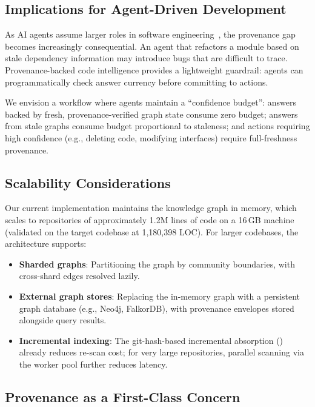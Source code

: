 \documentclass[conference]{IEEEtran}
\begin{document}
\subsection{Implications for Agent-Driven Development}

As AI agents assume larger roles in software
engineering~\cite{DevinAI2024, CopilotWorkspace2024}, the provenance
gap becomes increasingly consequential. An agent that refactors a
module based on stale dependency information may introduce bugs that are
difficult to trace. Provenance-backed code intelligence provides a
lightweight guardrail: agents can programmatically check answer currency
before committing to actions.

We envision a workflow where agents maintain a ``confidence budget'':
answers backed by fresh, provenance-verified graph state consume zero
budget; answers from stale graphs consume budget proportional to
staleness; and actions requiring high confidence (e.g., deleting code,
modifying interfaces) require full-freshness provenance.

\subsection{Scalability Considerations}

Our current implementation maintains the knowledge graph in memory,
which scales to repositories of approximately 1.2M lines of code on a
16\,GB machine (validated on the target codebase at 1,180,398 LOC). For larger codebases, the architecture supports:

\begin{itemize}
  \item \textbf{Sharded graphs}: Partitioning the graph by community
    boundaries, with cross-shard edges resolved lazily.
  \item \textbf{External graph stores}: Replacing the in-memory graph
    with a persistent graph database (e.g., Neo4j, FalkorDB), with
    provenance envelopes stored alongside query results.
  \item \textbf{Incremental indexing}: The git-hash-based incremental
    absorption () already reduces re-scan
    cost; for very large repositories, parallel scanning via the
    worker pool further reduces latency.
\end{itemize}

\subsection{Provenance as a First-Class Concern}
\end{document}
